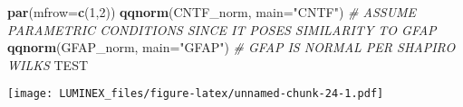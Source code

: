 \documentclass[]{article}
\newenvironment{Shaded}{\begin{snugshade}}{\end{snugshade}}
\newcommand{\AlertTok}[1]{\textcolor[rgb]{0.94,0.16,0.16}{#1}}
\newcommand{\CommentTok}[1]{\textcolor[rgb]{0.56,0.35,0.01}{\textit{#1}}}
\newcommand{\DataTypeTok}[1]{\textcolor[rgb]{0.13,0.29,0.53}{#1}}
\newcommand{\DecValTok}[1]{\textcolor[rgb]{0.00,0.00,0.81}{#1}}
\newcommand{\KeywordTok}[1]{\textcolor[rgb]{0.13,0.29,0.53}{\textbf{#1}}}
\newcommand{\NormalTok}[1]{#1}
\newcommand{\StringTok}[1]{\textcolor[rgb]{0.31,0.60,0.02}{#1}}
\begin{document}
\begin{Shaded}
\end{Shaded}

\begin{Shaded}
\begin{Highlighting}[]
\KeywordTok{par}\NormalTok{(}\DataTypeTok{mfrow=}\KeywordTok{c}\NormalTok{(}\DecValTok{1}\NormalTok{,}\DecValTok{2}\NormalTok{))}
\KeywordTok{qqnorm}\NormalTok{(CNTF_norm, }\DataTypeTok{main=}\StringTok{"CNTF"}\NormalTok{) }\CommentTok{# ASSUME PARAMETRIC CONDITIONS SINCE IT POSES SIMILARITY TO GFAP}
\KeywordTok{qqnorm}\NormalTok{(GFAP_norm, }\DataTypeTok{main=}\StringTok{"GFAP"}\NormalTok{) }\CommentTok{# GFAP IS NORMAL PER SHAPIRO WILKS }\AlertTok{TEST}
\end{Highlighting}
\end{Shaded}

\texttt{[image: LUMINEX\_files/figure-latex/unnamed-chunk-24-1.pdf]}
\end{document}
